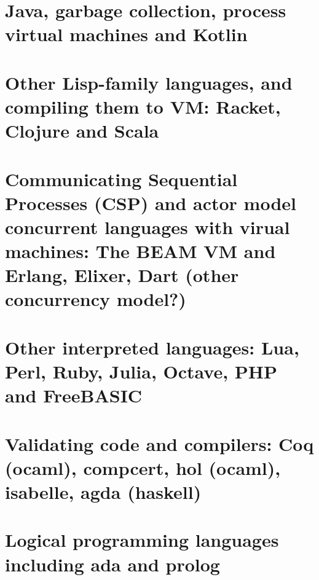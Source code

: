 \documentclass[oneside]{book}
\begin{document}
\part{Java, garbage collection, process virtual machines and Kotlin}



\part{Other Lisp-family languages, and compiling them to VM: Racket, Clojure and Scala}


\part{Communicating Sequential Processes (CSP) and actor model concurrent languages with virual machines: The BEAM VM and Erlang, Elixer, Dart (other concurrency model?)}


\part{Other interpreted languages: Lua, Perl, Ruby, Julia, Octave, PHP and FreeBASIC}





\part{Validating code and compilers: Coq (ocaml), compcert, hol (ocaml), isabelle, agda (haskell)}



\part{Logical programming languages including ada and prolog}

\end{document}
